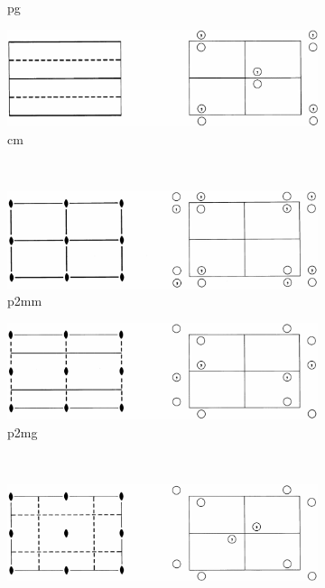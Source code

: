 \documentclass[12pt]{article}
\begin{document}
\begin{figure}[htp]
\begin{subfigure}[b]{0.45\textwidth}
        \caption*{pg}
    \end{subfigure}
    \begin{subfigure}[b]{0.45\textwidth}
        \centering
        \includegraphics[width=\textwidth]{planegroups/5.png}
        \caption*{cm}
    \end{subfigure}
	~    
    \begin{subfigure}[b]{0.45\textwidth}
        \centering
        \includegraphics[width=\textwidth]{planegroups/6.png}
        \caption*{p2mm}
    \end{subfigure}
    \begin{subfigure}[b]{0.45\textwidth}
        \centering
        \includegraphics[width=\textwidth]{planegroups/7.png}
        \caption*{p2mg}
    \end{subfigure}
	~    
    \begin{subfigure}[b]{0.45\textwidth}
        \centering
        \includegraphics[width=\textwidth]{planegroups/8.png}

\end{subfigure}
\end{figure}
\end{document}

